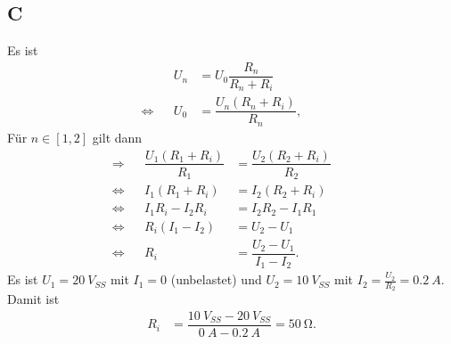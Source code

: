 \documentclass[a4paper,10pt]{article}
\numberwithin{equation}{section}
\begin{document}
\subsection{C}
Es ist
\begin{align} 
        &&U_n&=U_0\dfrac{R_n}{R_n+R_i}&&\\
        \Leftrightarrow &&U_0&=\dfrac{U_n\left(R_n+R_i\right)}{R_n},&&
\end{align} 
Für $n  \in  \left[1,2\right]$ gilt dann
\begin{align} 
        \Rightarrow &&\dfrac{U_1\left(R_1+R_i\right)}{R_1}&=\dfrac{U_2\left(R_2+R_i\right)}{R_2}&&\\
        \Leftrightarrow &&I_1\left(R_1+R_i\right)&=I_2\left(R_2+R_i\right)&&\nonumber \\
        \Leftrightarrow &&I_1R_i-I_2R_i&=I_2R_2-I_1R_1&&\nonumber \\
        \Leftrightarrow &&R_i\left(I_1-I_2\right)&=U_2-U_1&&\nonumber \\
        \Leftrightarrow &&R_i&=\dfrac{U_2-U_1}{I_1-I_2}.&&
\end{align} 
Es ist $U_1=\SI{20}{V_{SS}}$ mit $I_1=0$ (unbelastet) und $U_2=\SI{10}{V_{SS}}$ mit $I_2=\tfrac{U_2}{R_2}=\SI{0.2}{A}$.
Damit ist 
\begin{align} 
        R_i&=\dfrac{\SI{10}{V_{SS}}-\SI{20}{V_{SS} }}{\SI{0}{A}-\SI{0.2}{A}}=\SI{50}{\ohm}.
\end{align} 
\end{document}
